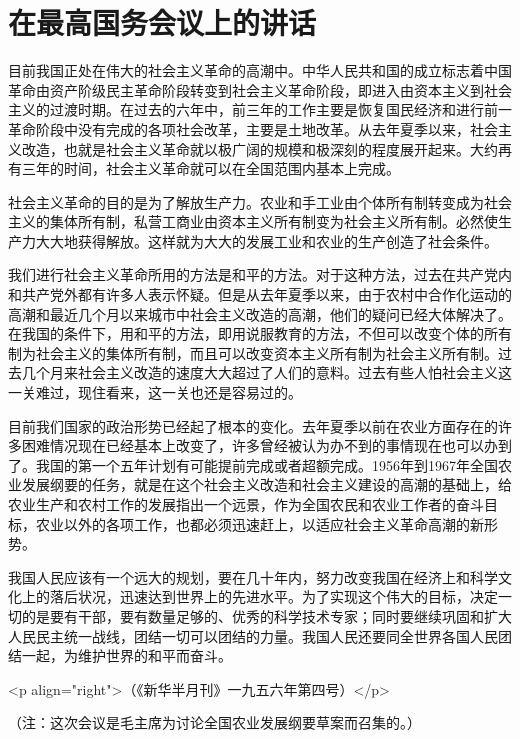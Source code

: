\section[在最高国务会议上的讲话（一九五六年一月二十五日）]{在最高国务会议上的讲话}


目前我国正处在伟大的社会主义革命的高潮中。中华人民共和国的成立标志着中国革命由资产阶级民主革命阶段转变到社会主义革命阶段，即进入由资本主义到社会主义的过渡时期。在过去的六年中，前三年的工作主要是恢复国民经济和进行前一革命阶段中没有完成的各项社会改革，主要是土地改革。从去年夏季以来，社会主义改造，也就是社会主义革命就以极广阔的规模和极深刻的程度展开起来。大约再有三年的时间，社会主义革命就可以在全国范围内基本上完成。

社会主义革命的目的是为了解放生产力。农业和手工业由个体所有制转变成为社会主义的集体所有制，私营工商业由资本主义所有制变为社会主义所有制。必然使生产力大大地获得解放。这样就为大大的发展工业和农业的生产创造了社会条件。

我们进行社会主义革命所用的方法是和平的方法。对于这种方法，过去在共产党内和共产党外都有许多人表示怀疑。但是从去年夏季以来，由于农村中合作化运动的高潮和最近几个月以来城市中社会主义改造的高潮，他们的疑问已经大体解决了。在我国的条件下，用和平的方法，即用说服教育的方法，不但可以改变个体的所有制为社会主义的集体所有制，而且可以改变资本主义所有制为社会主义所有制。过去几个月来社会主义改造的速度大大超过了人们的意料。过去有些人怕社会主义这一关难过，现住看来，这一关也还是容易过的。

目前我们国家的政治形势已经起了根本的变化。去年夏季以前在农业方面存在的许多困难情况现在已经基本上改变了，许多曾经被认为办不到的事情现在也可以办到了。我国的第一个五年计划有可能提前完成或者超额完成。1956年到1967年全国农业发展纲要的任务，就是在这个社会主义改造和社会主义建设的高潮的基础上，给农业生产和农村工作的发展指出一个远景，作为全国农民和农业工作者的奋斗目标，农业以外的各项工作，也都必须迅速赶上，以适应社会主义革命高潮的新形势。

我国人民应该有一个远大的规划，要在几十年内，努力改变我国在经济上和科学文化上的落后状况，迅速达到世界上的先进水平。为了实现这个伟大的目标，决定一切的是要有干部，要有数量足够的、优秀的科学技术专家；同时要继续巩固和扩大人民民主统一战线，团结一切可以团结的力量。我国人民还要同全世界各国人民团结一起，为维护世界的和平而奋斗。

<p align="right">（《新华半月刊》一九五六年第四号）</p>

（注：这次会议是毛主席为讨论全国农业发展纲要草案而召集的。）


